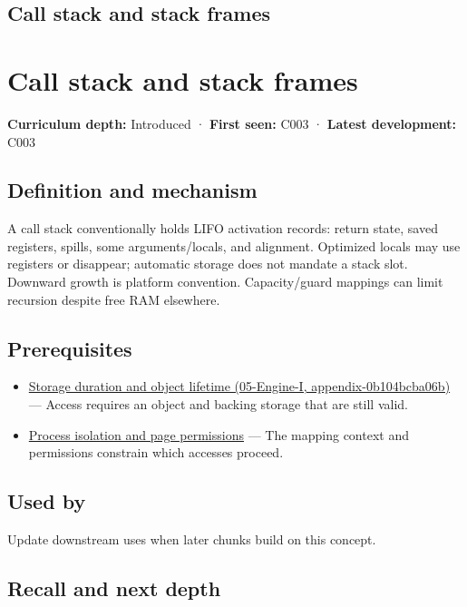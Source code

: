 \hypertarget{appendix-b081b7abe193}{}
\section*{Call stack and stack frames}
\chapter{Call stack and stack frames}\label{appendix-b081b7abe193-call-stack-and-stack-frames}

\textbf{Curriculum depth:} Introduced · \textbf{First seen:} C003 · \textbf{Latest development:} C003

\section{Definition and mechanism}\label{appendix-b081b7abe193-definition-and-mechanism}

A call stack conventionally holds LIFO activation records: return state, saved registers, spills, some arguments/locals, and alignment. Optimized locals may use registers or disappear; automatic storage does not mandate a stack slot. Downward growth is platform convention. Capacity/guard mappings can limit recursion despite free RAM elsewhere.

\section{Prerequisites}\label{appendix-b081b7abe193-prerequisites}

\begin{itemize}
\tightlist
\item
  \href{../05-Engine-I/main.pdf\#nameddest=appendix-0b104bcba06b}{Storage duration and object lifetime (05-Engine-I, appendix-0b104bcba06b)} --- Access requires an object and backing storage that are still valid.
\item
  \hyperref[appendix-c2a9ad1e2b49]{Process isolation and page permissions} --- The mapping context and permissions constrain which accesses proceed.
\end{itemize}

\section{Used by}\label{appendix-b081b7abe193-used-by}

Update downstream uses when later chunks build on this concept.

\section{Recall and next depth}\label{appendix-b081b7abe193-recall-and-next-depth}

